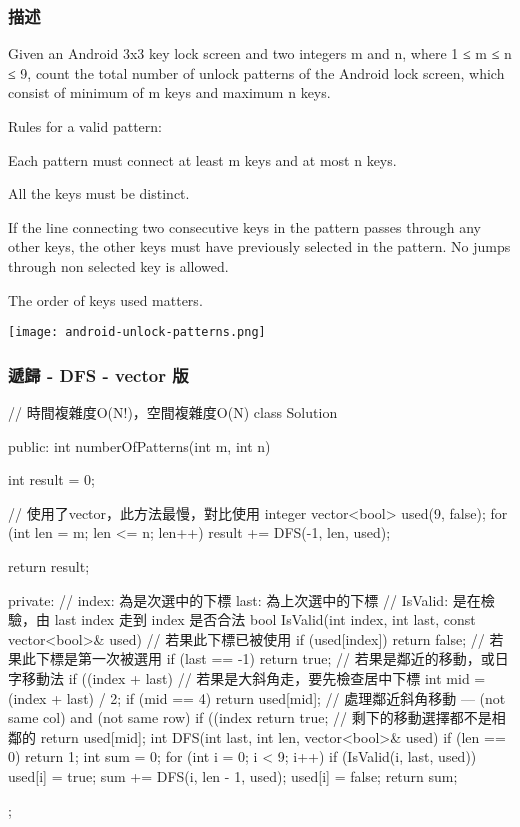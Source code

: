 \subsubsection{描述}
Given an Android 3x3 key lock screen and two integers m and n, where 1 ≤ m ≤ n ≤ 9, count the total number of unlock patterns of the Android lock screen, which consist of minimum of m keys and maximum n keys.

Rules for a valid pattern:
\begindot
\item Each pattern must connect at least m keys and at most n keys.
\item All the keys must be distinct.
\item If the line connecting two consecutive keys in the pattern passes through any other keys, the other keys must have previously selected in the pattern. No jumps through non selected key is allowed.
\item The order of keys used matters.
\myenddot

\begin{center}
\texttt{[image: android-unlock-patterns.png]}\\
\label{fig:android-unlock-patterns}
\end{center}

\subsubsection{遞歸 - DFS - vector 版}
\begin{Code}
// 時間複雜度O(N!)，空間複雜度O(N)
class Solution {
public:
    int numberOfPatterns(int m, int n) {
        int result = 0;

        // 使用了vector，此方法最慢，對比使用 integer
        vector<bool> used(9, false);
        for (int len = m; len <= n; len++)
            result += DFS(-1, len, used);

        return result;
    }
private:
    // index: 為是次選中的下標 last: 為上次選中的下標
    // IsValid: 是在檢驗，由 last index 走到 index 是否合法
    bool IsValid(int index, int last, const vector<bool>& used)
    {
        // 若果此下標已被使用
        if (used[index]) return false;
        // 若果此下標是第一次被選用
        if (last == -1) return true;
        // 若果是鄰近的移動，或日字移動法
        if ((index + last) %
        // 若果是大斜角走，要先檢查居中下標
        int mid = (index + last) / 2;
        if (mid == 4) return used[mid];
        // 處理鄰近斜角移動 --- (not same col) and (not same row)
        if ((index %
            return true;
        // 剩下的移動選擇都不是相鄰的
        return used[mid];
    }
    int DFS(int last, int len, vector<bool>& used)
    {
        if (len == 0)
            return 1;
        int sum = 0;
        for (int i = 0; i < 9; i++)
        {
            if (IsValid(i, last, used))
            {
                used[i] = true;
                sum += DFS(i, len - 1, used);
                used[i] = false;
            }
        }
        return sum;
    }
};
\end{Code}

